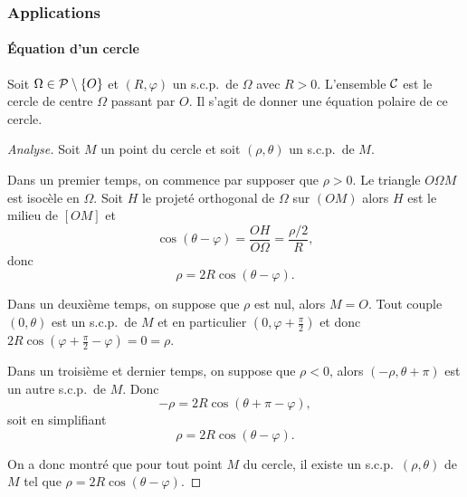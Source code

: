 \subsubsection{Applications}
\label{subsubsec:applicationeqcartetpol}

\paragraph{Équation d'un cercle}
\label{par:eqcercle}

Soit \(\Omega \in \P \setminus\{O\}\) et \((R , \varphi)\) un s.c.p.\ de 
\(\Omega\) avec \(R>0\). L'ensemble \(\courbe\) est le cercle de centre 
\(\Omega\) passant par \(O\). Il s'agit de donner une équation polaire de ce 
cercle.

\begin{proof}[Analyse]
    Soit \(M\) un point du cercle et soit \((\rho, \theta)\) un s.c.p.\ de 
    \(M\). 

    Dans un premier temps, on commence par supposer que \(\rho >0\). Le triangle 
    \(O\Omega M\) est isocèle en \(\Omega\). Soit \(H\) le projeté orthogonal de 
    \(\Omega\) sur \((OM)\) alors \(H\) est le milieu de \([OM]\) et
    \begin{equation}
        \cos(\theta - \varphi) = \frac{OH}{O\Omega} = \frac{\rho/2}{R}, 
    \end{equation}
    donc
    \begin{equation}
        \rho = 2R \cos(\theta - \varphi).
    \end{equation}

    Dans un deuxième temps, on suppose que \(\rho\) est nul, alors \(M = O\). 
    Tout couple \((0 , \theta)\) est un s.c.p.\ de \(M\) et en particulier 
    \((0 , \varphi + \frac{\pi}{2})\) et donc \(2R \cos(\varphi + \frac{\pi}{2} - 
    \varphi) = 0 = \rho\). 

    Dans un troisième et dernier temps, on suppose que \(\rho <0\), alors 
    \((-\rho, \theta + \pi)\) est un autre s.c.p.\ de \(M\). Donc
    \begin{equation}
        -\rho = 2R \cos(\theta + \pi - \varphi),
    \end{equation}
    soit en simplifiant
    \begin{equation}
        \rho = 2R\cos(\theta - \varphi).
    \end{equation}

    On a donc montré que pour tout point \(M\) du cercle, il existe un s.c.p.\ 
    \((\rho , \theta)\) de \(M\) tel que \(\rho = 2R\cos(\theta - \varphi)\).
\end{proof}

